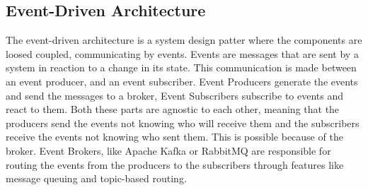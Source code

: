 \subsection{Event-Driven Architecture}
The event-driven architecture is a system design patter where the components
are loosed coupled, communicating by events. Events are messages that are sent
by a system in reaction to a change in its state. This communication is made
between an event producer, and an event subscriber. Event Producers generate the
events and send the messages to a broker, Event Subscribers subscribe to
events and react to them. Both these parts are agnostic to each other, meaning
that the producers send the events not knowing who will receive them and the
subscribers receive the events not knowing who sent them. This is possible
because of the broker. Event Brokers, like Apache Kafka or RabbitMQ are
responsible for routing the events from the producers to the subscribers through
features like message queuing and topic-based routing.

